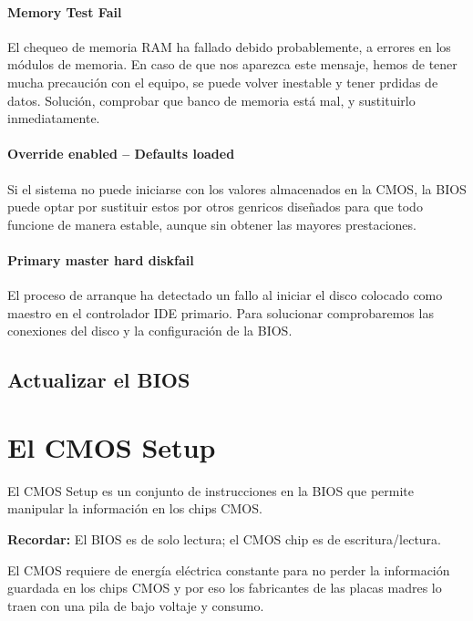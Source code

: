 \documentclass[12pt,oneside,a4paper]{article}
\begin{document}
			\paragraph{Memory Test Fail}

			El chequeo de memoria RAM ha fallado debido probablemente, a
			errores en los módulos de memoria. En caso de que nos aparezca este
			mensaje, hemos de tener mucha precaución con el equipo, se puede
			volver inestable y tener prdidas de datos. Solución, comprobar que
			banco de memoria está mal, y sustituirlo inmediatamente. 

			\paragraph{Override enabled – Defaults loaded}

			Si el sistema no puede iniciarse con los valores almacenados en la
			CMOS, la BIOS puede optar por sustituir estos por otros genricos
			diseñados para que todo funcione de manera estable, aunque sin
			obtener las mayores prestaciones. 

			\paragraph{Primary master hard diskfail}

			El proceso de arranque ha detectado un fallo al iniciar el disco
			colocado como maestro en el controlador IDE primario. Para
			solucionar comprobaremos las conexiones del disco y la
			configuración de la BIOS. 
	
	\subsection{Actualizar el BIOS}\label{sec:actualizar el bios}

	\newpage

\section{El CMOS Setup}{\label{sec:cmossetup}}

	El CMOS Setup es un conjunto de instrucciones en la BIOS que permite
	manipular la información en los chips CMOS.

	{\bf Recordar:} El BIOS es de solo lectura; el CMOS chip es de escritura/lectura.

	El CMOS requiere de energía eléctrica constante para no perder la
	información guardada en los chips CMOS y por eso los fabricantes de las
	placas madres lo traen con una pila de bajo voltaje y consumo.
\end{document}
